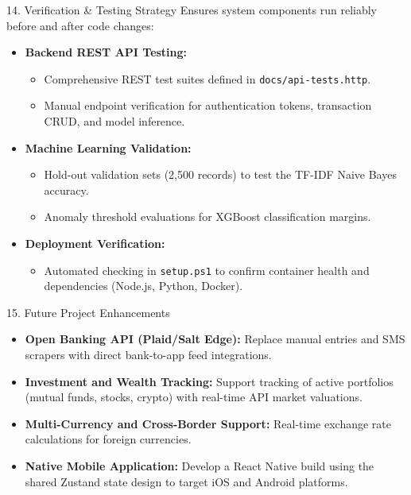 \documentclass[10pt,aspectratio=169]{beamer}
\begin{document}
\begin{frame}{14. Verification \& Testing Strategy}
    Ensures system components run reliably before and after code changes:
    
    \begin{itemize}
        \item \textbf{Backend REST API Testing:}
            \begin{itemize}
                \item Comprehensive REST test suites defined in \texttt{docs/api-tests.http}.
                \item Manual endpoint verification for authentication tokens, transaction CRUD, and model inference.
            \end{itemize}
        \item \textbf{Machine Learning Validation:}
            \begin{itemize}
                \item Hold-out validation sets (2,500 records) to test the TF-IDF Naive Bayes accuracy.
                \item Anomaly threshold evaluations for XGBoost classification margins.
            \end{itemize}
        \item \textbf{Deployment Verification:}
            \begin{itemize}
                \item Automated checking in \texttt{setup.ps1} to confirm container health and dependencies (Node.js, Python, Docker).
            \end{itemize}
    \end{itemize}
\end{frame}

\begin{frame}{15. Future Project Enhancements}
    \begin{itemize}
        \item \textbf{Open Banking API (Plaid/Salt Edge):} Replace manual entries and SMS scrapers with direct bank-to-app feed integrations.
        \item \textbf{Investment and Wealth Tracking:} Support tracking of active portfolios (mutual funds, stocks, crypto) with real-time API market valuations.
        \item \textbf{Multi-Currency and Cross-Border Support:} Real-time exchange rate calculations for foreign currencies.
        \item \textbf{Native Mobile Application:} Develop a React Native build using the shared Zustand state design to target iOS and Android platforms.
    \end{itemize}
\end{frame}
\end{document}
